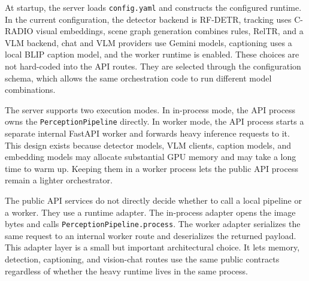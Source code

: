 At startup, the server loads \texttt{config.yaml} and constructs the configured runtime. In the current configuration, the detector backend is RF-DETR, tracking uses C-RADIO visual embeddings, scene graph generation combines rules, RelTR, and a VLM backend, chat and VLM providers use Gemini models, captioning uses a local BLIP caption model, and the worker runtime is enabled. These choices are not hard-coded into the API routes. They are selected through the configuration schema, which allows the same orchestration code to run different model combinations.

The server supports two execution modes. In in-process mode, the API process owns the \texttt{PerceptionPipeline} directly. In worker mode, the API process starts a separate internal FastAPI worker and forwards heavy inference requests to it. This design exists because detector models, VLM clients, caption models, and embedding models may allocate substantial GPU memory and may take a long time to warm up. Keeping them in a worker process lets the public API process remain a lighter orchestrator.

The public API services do not directly decide whether to call a local pipeline or a worker. They use a runtime adapter. The in-process adapter opens the image bytes and calls \texttt{PerceptionPipeline.process}. The worker adapter serializes the same request to an internal worker route and deserializes the returned payload. This adapter layer is a small but important architectural choice. It lets memory, detection, captioning, and vision-chat routes use the same public contracts regardless of whether the heavy runtime lives in the same process.

